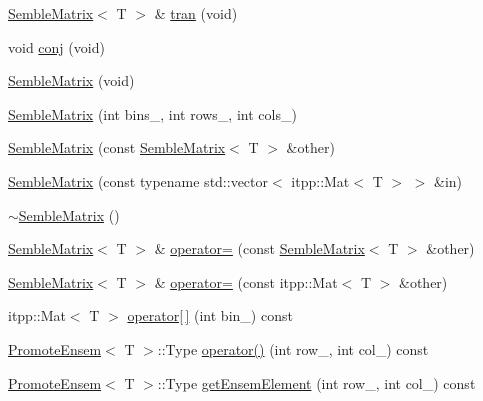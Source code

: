 \begin{DoxyCompactItemize}
\item 
\mbox{\hyperlink{structSEMBLE_1_1SembleMatrix}{Semble\+Matrix}}$<$ T $>$ \& \mbox{\hyperlink{structSEMBLE_1_1SembleMatrix_a1f306991f4b4e22697c8b1c5e1fc9d66}{tran}} (void)
\item 
void \mbox{\hyperlink{structSEMBLE_1_1SembleMatrix_ae1a1e21202bf3bb9198e8f769a3c9697}{conj}} (void)
\item 
\mbox{\hyperlink{structSEMBLE_1_1SembleMatrix_a870fcbb89e1fd8f5ad2404edc58b53d6}{Semble\+Matrix}} (void)
\item 
\mbox{\hyperlink{structSEMBLE_1_1SembleMatrix_afaf672b694d5af975145b48ede17dfe5}{Semble\+Matrix}} (int bins\+\_\+, int rows\+\_\+, int cols\+\_\+)
\item 
\mbox{\hyperlink{structSEMBLE_1_1SembleMatrix_a11b1a303d2acda92882da3328762c9d9}{Semble\+Matrix}} (const \mbox{\hyperlink{structSEMBLE_1_1SembleMatrix}{Semble\+Matrix}}$<$ T $>$ \&other)
\item 
\mbox{\hyperlink{structSEMBLE_1_1SembleMatrix_ae0777794c361366bc0840e443e60d18b}{Semble\+Matrix}} (const typename std\+::vector$<$ itpp\+::\+Mat$<$ T $>$ $>$ \&in)
\item 
\mbox{\hyperlink{structSEMBLE_1_1SembleMatrix_a58bec7f5fd4b0169dfbbb472981e9dee}{$\sim$\+Semble\+Matrix}} ()
\item 
\mbox{\hyperlink{structSEMBLE_1_1SembleMatrix}{Semble\+Matrix}}$<$ T $>$ \& \mbox{\hyperlink{structSEMBLE_1_1SembleMatrix_a74e1c17cd1508165df588807c3ee5ce8}{operator=}} (const \mbox{\hyperlink{structSEMBLE_1_1SembleMatrix}{Semble\+Matrix}}$<$ T $>$ \&other)
\item 
\mbox{\hyperlink{structSEMBLE_1_1SembleMatrix}{Semble\+Matrix}}$<$ T $>$ \& \mbox{\hyperlink{structSEMBLE_1_1SembleMatrix_aa8b242b6d0156b1cbaaa65dfa60f343b}{operator=}} (const itpp\+::\+Mat$<$ T $>$ \&other)
\item 
itpp\+::\+Mat$<$ T $>$ \mbox{\hyperlink{structSEMBLE_1_1SembleMatrix_aa94e51e73d150167c5ad97d4c8291add}{operator\mbox{[}$\,$\mbox{]}}} (int bin\+\_\+) const
\item 
\mbox{\hyperlink{structSEMBLE_1_1PromoteEnsem}{Promote\+Ensem}}$<$ T $>$\+::Type \mbox{\hyperlink{structSEMBLE_1_1SembleMatrix_ac971ccfb246830b41dc70f8003281cae}{operator()}} (int row\+\_\+, int col\+\_\+) const
\item 
\mbox{\hyperlink{structSEMBLE_1_1PromoteEnsem}{Promote\+Ensem}}$<$ T $>$\+::Type \mbox{\hyperlink{structSEMBLE_1_1SembleMatrix_a94e51c97855304a2fc8a59ef4ee8b109}{get\+Ensem\+Element}} (int row\+\_\+, int col\+\_\+) const

\end{DoxyCompactItemize}
